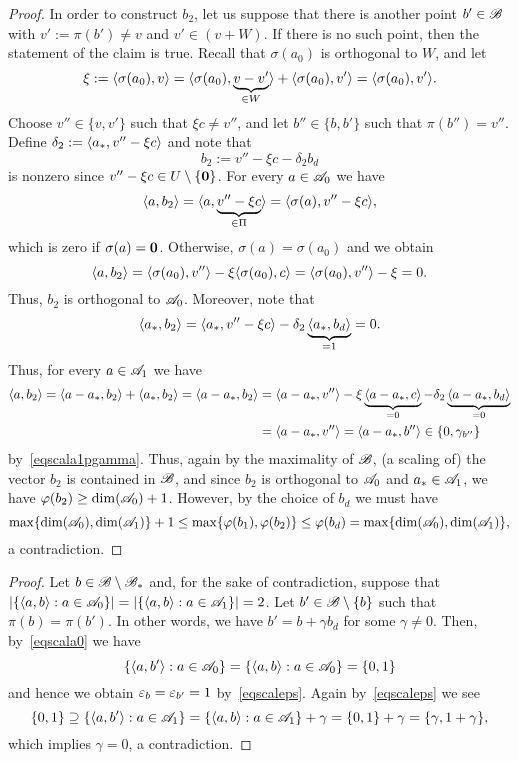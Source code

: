 \begin{proof}
    In order to construct $b_2$, let us suppose that there is another point $b' \in {\mathscr{B}}$ with $v' := \pi(b') \ne v$ and $v' \in (v + W)$.
    If there is no such point, then the statement of the claim is true.
    Recall that $\sigma(a_0)$ is orthogonal to $W$, and let
    \[
        \xi := \langle \sigma(a_0), v\rangle = \langle \sigma(a_0), \underbrace{v - v'}_{\in W}\rangle + \langle \sigma(a_0), v'\rangle = \langle \sigma(a_0), v'\rangle.
    \]
    Choose $v'' \in \{v,v'\}$ such that $\xi c \ne v''$, and let $b'' \in \{b,b'\}$ such that $\pi(b'') = v''$.
    Define $\delta_2 := \langle a_*,v'' - \xi c\rangle$ and note that
    \[
        b_2 := v'' - \xi c - \delta_2 b_d
    \]
    is nonzero since $v'' - \xi c \in U \setminus \{\mathbf{0}\}$.
    For every $a \in {\mathscr{A}}_0$ we have
    \[
        \langle a,b_2\rangle = \langle a, \underbrace{v'' - \xi c}_{\in \Pi}\rangle = \langle \sigma(a), v'' - \xi c\rangle,
    \]
    which is zero if $\sigma(a) = \mathbf{0}$.
    Otherwise, $\sigma(a) = \sigma(a_0)$ and we obtain
    \[
        \langle a,b_2\rangle = \langle \sigma(a_0), v''\rangle - \xi \langle \sigma(a_0), c\rangle = \langle \sigma(a_0), v''\rangle - \xi = 0.
    \]
    Thus, $b_2$ is orthogonal to ${\mathscr{A}}_0$.
    Moreover, note that
    \[
        \langle a_*, b_2\rangle = \langle a_*, v'' - \xi c\rangle - \delta_2 \underbrace{\langle a_*, b_d\rangle}_{= 1} = 0.
    \]
    Thus, for every $a \in {\mathscr{A}}_1$ we have
    \begin{align*}
        \langle a,b_2\rangle
        = \langle a - a_*, b_2\rangle + \langle a_*, b_2\rangle
        = \langle a - a_*, b_2\rangle
        & = \langle a - a_*, v''\rangle - \xi \underbrace{\langle a - a_*, c\rangle}_{= 0} - \delta_2 \underbrace{\langle a - a_*, b_d\rangle}_{= 0} \\
        & = \langle a - a_*, v''\rangle = \langle a - a_*, b''\rangle \in \{0,\gamma_{b''}\}
    \end{align*}
    by~\eqref{eqscala1pgamma}.
    Thus, again by the maximality of ${\mathscr{B}}$, (a scaling of) the vector $b_2$ is contained in ${\mathscr{B}}$, and since $b_2$ is orthogonal to ${\mathscr{A}}_0$ and $a_* \in {\mathscr{A}}_1$, we have $\varphi(b_2) \ge \dim({\mathscr{A}}_0) + 1$.
    However, by the choice of $b_d$ we must have
    \[
         \max \{ \dim({\mathscr{A}}_0), \dim({\mathscr{A}}_1) \} + 1 \le \max \{\varphi(b_1), \varphi(b_2)\} \le \varphi(b_d) = \max\{\dim({\mathscr{A}}_0), \dim({\mathscr{A}}_1)\},
    \]
    a contradiction.
\end{proof}

\claimrestbbconstant*
\begin{proof}
    Let $b \in {\mathscr{B}} \setminus {\mathscr{B}}_*$ and, for the sake of contradiction, suppose that $|\{ \langle a,b\rangle : a \in {\mathscr{A}}_0 \}| = |\{ \langle a,b\rangle : a \in {\mathscr{A}}_1 \}| = 2$.
    Let $b' \in {\mathscr{B}} \setminus \{b\}$ such that $\pi(b) = \pi(b')$.
    In other words, we have $b' = b + \gamma b_d$ for some $\gamma \ne 0$.
    Then, by~\eqref{eqscala0} we have
    \[
        \{ \langle a,b'\rangle : a \in {\mathscr{A}}_0 \} = \{ \langle a,b\rangle : a \in {\mathscr{A}}_0 \} = \{0,1\}
    \]
    and hence we obtain ${\varepsilon}_b = {\varepsilon}_{b'} = 1$ by~\eqref{eqscaleps}.
    Again by~\eqref{eqscaleps} we see
    \[
        \{0,1\} \supseteq \{ \langle a,b'\rangle : a \in {\mathscr{A}}_1 \} = \{ \langle a,b\rangle : a \in {\mathscr{A}}_1 \} + \gamma = \{0,1\} + \gamma = \{\gamma, 1+\gamma\},
    \]
    which implies $\gamma = 0$, a contradiction.
\end{proof}

